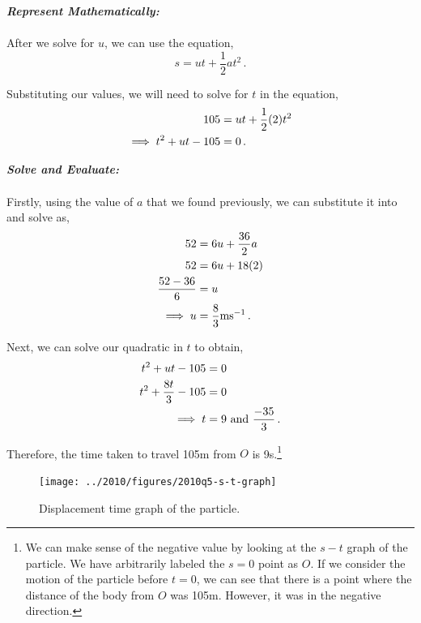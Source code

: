 \begin{subquestions}
\begin{subsubquestions}
\textbf{\textit{Represent Mathematically:}} \\ \\
After we solve for $u$, we can use the equation,
\begin{equation}
	s=ut+\frac{1}{2}at^2 \,.
\end{equation}

Substituting our values, we will need to solve for $t$ in the equation,
\begin{align}
	105 & = ut+\frac{1}{2}(2)t^2 \nonumber \\
		\implies t^2 +ut -105 & = 0 \,.
\end{align}




\textbf{\textit{Solve and Evaluate:}} \\ \\
Firstly, using the value of $a$ that we found previously, we can substitute it into  and solve as,
\begin{align}
	52 & = 6u + \frac{36}{2}a \nonumber \\
	52 & = 6u + 18(2) \nonumber \\ 
	\frac{52-36}{6} & = u \nonumber \\
	\implies u & = \frac{8}{3}\text{ms}^{-1} \,.
\end{align}

Next, we can solve our quadratic in $t$ to obtain,
\begin{align}
	t^2 +ut -105 & = 0 \nonumber \\
	t^2 +\frac{8t}{3} -105 & = 0 \nonumber \\
	\implies t & = 9 ~\text{and}~\frac{-35}{3} \,.
\end{align}

Therefore, the time taken to travel 105m from $O$ is 9s.\footnote{We can make sense of the negative value by looking at the $s-t$ graph of the particle. We have arbitrarily labeled the $s=0$ point as $O$. If we consider the motion of the particle before $t=0$, we can see that there is a point where the distance of the body from $O$ was 105m. However, it was in the negative direction.}
\begin{figure}[H]
	\begin{center}
		\texttt{[image: ../2010/figures/2010q5-s-t-graph]}
		\caption{\label{2010:q5:stGraph} Displacement time graph of the particle.}
	\end{center}
\end{figure}



\end{subsubquestions}
	

\end{subquestions}
